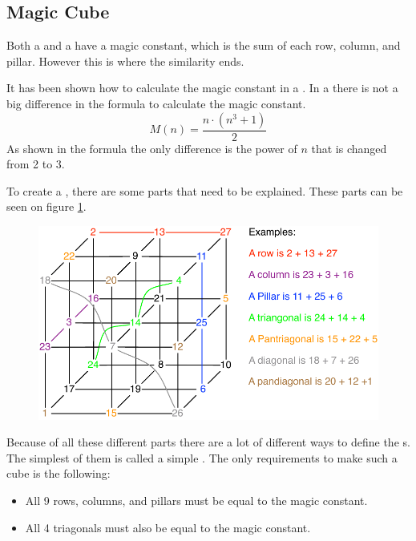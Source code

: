 \subsection{Magic Cube}
\label{sub:mcube}


Both a \msquare{} and a \mcube{} have a magic constant, which is the sum of each row, column, and pillar.
However this is where the similarity ends. 

It has been shown how to calculate the magic constant in a \msquare{}.
In a \mcube{} there is not a big difference in the formula to calculate the magic constant.
\begin{equation}
	M(n)=\frac{n \cdot (n^3+1)}{2}
\end{equation}
As shown in the formula the only difference is the power of $n$ that is changed from 2 to 3.

To create a  \mcube{}, there are some parts that need to be explained.
These parts can be seen on figure \ref{fig:cubeparts}.

\begin{figure}[htb]
	\centering
		\includegraphics[scale=0.5]{input/pics/cubeparts.pdf}
	\caption{}
	\label{fig:cubeparts}
\end{figure}

Because of all these different parts there are a lot of different ways to define the \mcube{}s.
The simplest of them is called a simple \mcube{}. The only requirements to make such a cube is the following:
\begin{itemize}
	\item All 9 rows, columns, and pillars must be equal to the magic constant.
	\item All 4 triagonals must also be equal to the magic constant.
\end{itemize}

